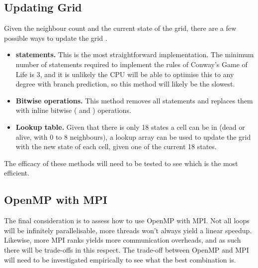     \subsection{Updating Grid}\label{subsec:update-grid}
    Given the neighbour count and the current state of the grid, there are a few possible ways to update the grid \cite{branchless-programming}.
    \begin{itemize}
        \item \textbf{ statements.} This is the most straightforward implementation.
        The minimum number of  statements required to implement the rules of Conway's Game of Life is 3,
        and it is unlikely the CPU will be able to optimise this to any degree with branch prediction, so
        this method will likely be the slowest.
        \item \textbf{Bitwise operations.} This method removes all  statements and replaces them with
            inline bitwise (\inlinecode{&&} and \inlinecode{||}) operations.
        \item \textbf{Lookup table.} Given that there is only 18 states a cell can be in (dead or alive, with 0 to 8 neighbours),
            a lookup array can be used to update the grid with the new state of each cell, given one of the current
            18 states.
    \end{itemize}
    The efficacy of these methods will need to be tested to see which is the most efficient.

    \subsection{OpenMP with MPI}\label{subsec:omp-with-mpi}
    The final consideration is to assess how to use OpenMP with MPI.
    Not all loops will be infinitely parallelisable, more threads won't always yield a linear speedup.
    Likewise, more MPI ranks yields more communication overheads, and as such there will be trade-offs in this respect.
    The trade-off between OpenMP and MPI will need to be investigated empirically to see what the best combination is.



